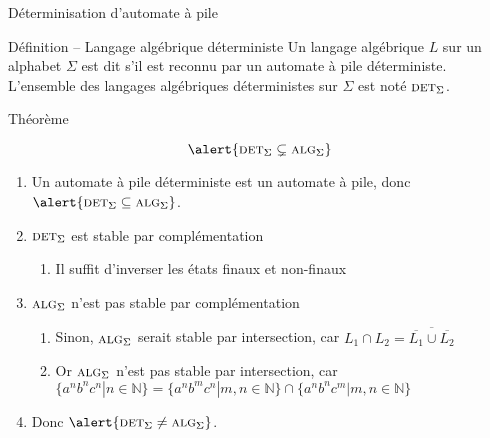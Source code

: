 
\begingroup

\begin{frame}{Déterminisation d'automate à pile}
  \begin{block}{Définition -- Langage algébrique déterministe}
    Un langage algébrique $L$ sur un alphabet $\Sigma$ est dit  s'il est reconnu par un automate à pile déterministe.
    L'ensemble des langages algébriques déterministes sur $\Sigma$ est noté $\textsc{det}_\Sigma$.
  \end{block}
  
  \begin{block}{Théorème}
    
    \vspace{-4mm}
    $$\alert{\textsc{det}_\Sigma \subsetneq \textsc{alg}_\Sigma}$$

    \vspace{-1mm}
    \begin{enumerate}
    \item Un automate à pile déterministe est un automate à pile, donc $\alert{\textsc{det}_\Sigma \subseteq \textsc{alg}_\Sigma}$.
    \item $\textsc{det}_\Sigma$ est stable par complémentation
      \begin{enumerate}
      \item Il suffit d'inverser les états finaux et non-finaux
      \end{enumerate}
    \item $\textsc{alg}_\Sigma$ n'est pas stable par complémentation
      \begin{enumerate}
      \item Sinon, $\textsc{alg}_\Sigma$ serait stable par intersection, car $L_1 \cap L_2 = \overline{\overline{L_1} \cup \overline{L_2}}$
      \item Or $\textsc{alg}_\Sigma$ n'est pas stable par intersection, car $\{a^n b^n c^n | n\in \mathbb{N}\} = \{a^n b^m c^n | m, n\in \mathbb{N}\} \cap \{a^n b^n c^m | m, n\in \mathbb{N}\}$
      \end{enumerate}
    \item Donc $\alert{\textsc{det}_\Sigma \neq \textsc{alg}_\Sigma}$.
    \end{enumerate}
  \end{block}
\end{frame}

\endgroup
